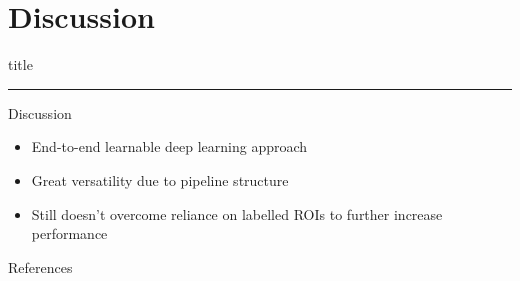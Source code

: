 \documentclass{beamer}
\begin{document}
\section{Discussion}
    \begin{frame}[plain]
        \vfill
      \centering
      \begin{beamercolorbox}[sep=8pt,center,shadow=true,rounded=true]{title}
        \insertsectionhead\par%
        \color{oxfordblue}\noindent\rule{10cm}{1pt} 
        
      \end{beamercolorbox}
      \vfill
  \end{frame}
\begin{frame}{Discussion}
  \begin{itemize}
  	\item End-to-end learnable deep learning approach
  	\item<2-> Great versatility due to pipeline structure
  	\item<3-> Still doesn't overcome reliance on labelled ROIs to further increase performance 
  \end{itemize}
\end{frame}



\begin{frame}{References}


\end{frame}
\end{document}
